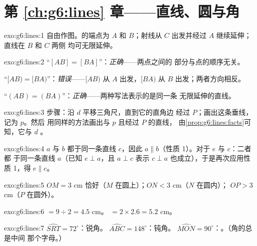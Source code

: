 \section*{第 \ref{ch:g6:lines} 章——直线、圆与角}

\begin{solution}{exo:g6:lines:1}
自由作图。的端点为 $A$ 和 $B$；射线从
$C$ 出发并经过 $A$ 继续延伸；直线在 $B$ 和 $C$ 两侧
均可无限延伸。
\end{solution}

\begin{solution}{exo:g6:lines:2}
“$[AB] = [BA]$”：\emph{正确}——两点之间的
部分与点的顺序无关。

“$[AB) = [BA)$”：\emph{错误}——$[AB)$ 从 $A$ 出发，$[BA)$ 从
$B$ 出发；两者方向相反。

“$(AB) = (BA)$”：\emph{正确}——两种写法表示的是同一条
无限延伸的直线。
\end{solution}

\begin{solution}{exo:g6:lines:3}
步骤：沿 $d$ 平移三角尺，直到它的直角边
经过 $P$；画出这条垂线，记为 $p$。然后
用同样的方法画出与 $p$ 且经过 $P$ 的直线，
由\cref{prop:g6:lines:facts}可知，它与 $d$ 。
\end{solution}

\begin{solution}{exo:g6:lines:4}
$a$ 与 $b$ 都于同一条直线 $c$，因此
$a \parallel b$（性质 1）。对于 $e$ 与 $c$：二者都
于同一条直线 $a$（已知 $e \perp a$，且 $a \perp c$ 表示
$c \perp a$ 也成立），于是再次应用性质 1，得 $e \parallel c$。
\end{solution}

\begin{solution}{exo:g6:lines:5}
$OM = 3$ cm 恰好（$M$ 在圆上）；$ON < 3$ cm（$N$ 在圆内）；
$OP > 3$ cm（$P$ 在圆外）。
\end{solution}

\begin{solution}{exo:g6:lines:6}
 $= 9 \div 2 = 4.5$ cm。\quad {} $= 2 \times 2.6 = 5.2$ cm。
\end{solution}

\begin{solution}{exo:g6:lines:7}
$\widehat{SRT} = 72^\circ$：锐角。\quad
$\widehat{ABC} = 148^\circ$：钝角。\quad
$\widehat{MON} = 90^\circ$：。（角的总是中间
那个字母。）
\end{solution}

